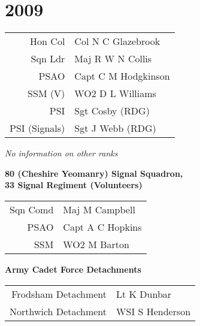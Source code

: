 \chapter*{2009}

\begin{center}
  \small
  \begin{tabular}{rl}
    Hon Col & Col N C Glazebrook \\
    Sqn Ldr & Maj R W N Collis \\
    PSAO & Capt C M Hodgkinson \\
    SSM (V) & WO2 D L Williams \\
    PSI & Sgt Cosby (RDG) \\
    PSI (Signals) & Sgt J Webb (RDG) \\
  \end{tabular}
\end{center}

\begin{center}
  \textit{No information on other ranks}
\end{center}

\begin{center}
  \Large
  \textbf{80 (Cheshire Yeomanry) Signal Squadron, \\ 33 Signal Regiment (Volunteers)}
\end{center}

\begin{center}
  \small
  \begin{tabular}{rl}
    Sqn Comd & Maj M Campbell \\
    PSAO & Capt A C Hopkins \\
    SSM & WO2 M Barton \\
  \end{tabular}
\end{center}

\begin{center}
  \Large
  \textbf{Army Cadet Force Detachments}
\end{center}

\begin{center}
  \small
  \begin{tabular}{rl}
    Frodsham Detachment & Lt K Dunbar \\
    Northwich Detachment & WSI S Henderson \\
  \end{tabular}
\end{center}

\vspace{50mm}

\pagebreak
